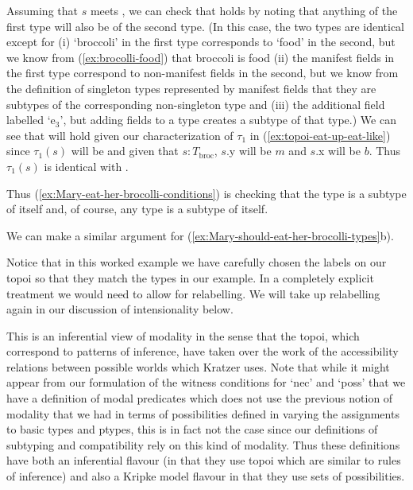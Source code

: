 Assuming that $s$ meets , we can check that  holds
by noting that anything of the first type will also be of the second
type.  (In this case, the two types are identical except for (i)
`broccoli' in the first type corresponds to `food' in the second, but
we know from (\ref{ex:brocolli-food}) that broccoli is food (ii) the
manifest fields in the first type correspond to non-manifest fields in
the second, but we know from the definition of singleton types
represented by manifest fields that
they are subtypes of the corresponding non-singleton type and (iii)
the additional field labelled `e$_3$', but adding fields to a type
creates a subtype of that type.)
We can see that  will hold given our characterization of
$\tau_1$ in (\ref{ex:topoi-eat-up-eat-like}) since $\tau_1(s)$ will be
 and given that $s:T_{\mathrm{broc}}$, $s$.y will be $m$ and
$s$.x will be $b$.  Thus $\tau_1(s)$ is identical with .
\begin{ex} 
\begin{subex} 
 
\item {} 
 
\item {} 
 
\end{subex} 
   
\end{ex} 
Thus (\ref{ex:Mary-eat-her-brocolli-conditions}) is checking that the
type  is a subtype of
itself and, of course, any type is a subtype of itself. 

We can make a similar argument for (\ref{ex:Mary-should-eat-her-brocolli-types}b).

Notice that in this worked example we have carefully chosen the labels
on our topoi so that they match the types in our example.  In a
completely explicit treatment we would need to allow for relabelling.
We will take up relabelling again in our discussion of intensionality
below.   
   

This is an inferential view of modality in the sense that the topoi,
which correspond to patterns of inference, have taken over the work of
the accessibility relations between possible worlds which Kratzer
uses.  
Note that while it might appear from our formulation of the witness
conditions for `nec' and `poss' that we have a
definition of modal predicates which does not use the previous notion
of modality that we had in terms of possibilities defined in varying
the assignments to basic types and ptypes, this is in fact not the
case since our definitions of subtyping and compatibility rely on this
kind of modality.  Thus these definitions have both an inferential
flavour (in that they use topoi which are similar to rules of
inference) and also a Kripke model flavour in that they use sets of
possibilities.

